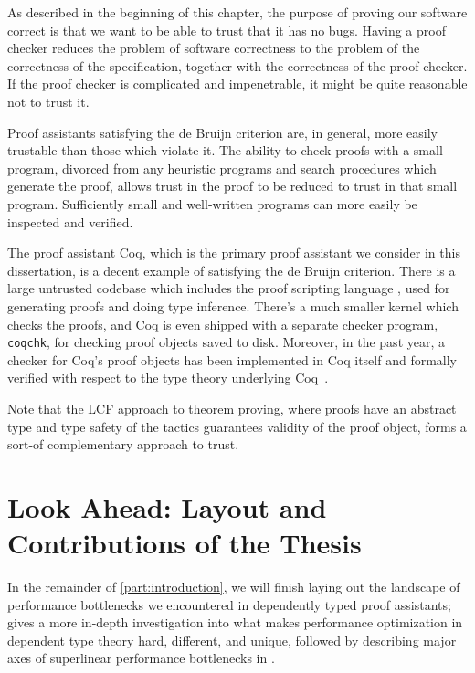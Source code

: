 As described in the beginning of this chapter, the purpose of proving our software correct is that we want to be able to trust that it has no bugs.
Having a proof checker reduces the problem of software correctness to the problem of the correctness of the specification, together with the correctness of the proof checker.
If the proof checker is complicated and impenetrable, it might be quite reasonable not to trust it.

Proof assistants satisfying the de Bruijn criterion are, in general, more easily trustable than those which violate it.
The ability to check proofs with a small program, divorced from any heuristic programs and search procedures which generate the proof, allows trust in the proof to be reduced to trust in that small program.
Sufficiently small and well-written programs can more easily be inspected and verified.


The proof assistant Coq, which is the primary proof assistant we consider in this dissertation, is a decent example of satisfying the de Bruijn criterion.
There is a large untrusted codebase which includes the proof scripting language \Ltac, used for generating proofs and doing type inference.
\label{sec:ltac-first-mention}
There's a much smaller kernel which checks the proofs, and Coq is even shipped with a separate checker program, \texttt{coqchk}, for checking proof objects saved to disk.
Moreover, in the past year, a checker for Coq's proof objects has been implemented in Coq itself and formally verified with respect to the type theory underlying Coq~\cite{coq-coq-correct}.

Note that the LCF approach to theorem proving, where proofs have an abstract type and type safety of the tactics guarantees validity of the proof object, forms a sort-of complementary approach to trust.


\section{Look Ahead: Layout and Contributions of the Thesis}\label{sec:intro:layout}
In the remainder of \autoref{part:introduction}, we will finish laying out the landscape of performance bottlenecks we encountered in dependently typed proof assistants;
 gives a more in-depth investigation into what makes performance optimization in dependent type theory hard, different, and unique, followed by describing major axes of superlinear performance bottlenecks in .

